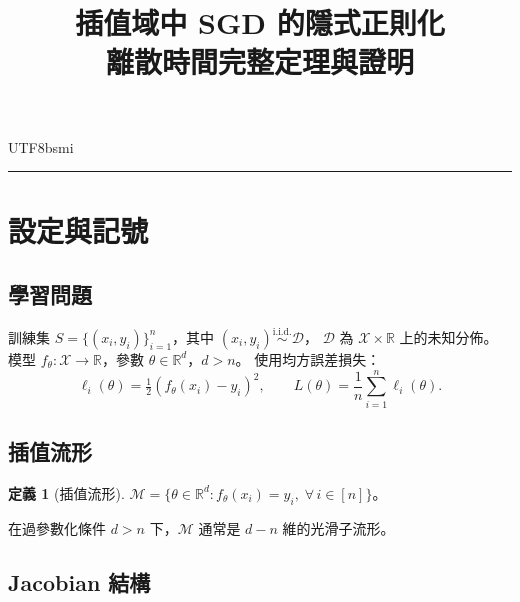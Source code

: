 \documentclass[11pt,a4paper]{article}
\theoremstyle{definition}
\newtheorem{definition}[theorem]{定義}
\newcommand{\R}{\mathbb{R}}
\newcommand{\cM}{\mathcal{M}}
\newcommand{\cX}{\mathcal{X}}
\newcommand{\cD}{\mathcal{D}}
\begin{document}
\begin{CJK}{UTF8}{bsmi}

\title{插值域中 SGD 的隱式正則化\\
  {\large 離散時間完整定理與證明}}
\author{}
\date{}
\maketitle

\tableofcontents
\bigskip\hrule\bigskip

\section{設定與記號}

\subsection{學習問題}

訓練集 $S = \{(x_i, y_i)\}_{i=1}^n$，其中 $(x_i, y_i) \stackrel{\text{i.i.d.}}{\sim} \cD$，
$\cD$ 為 $\cX \times \R$ 上的未知分佈。
模型 $f_\theta : \cX \to \R$，參數 $\theta \in \R^d$，$d > n$。
使用均方誤差損失：
\[
  \ell_i(\theta) = \tfrac{1}{2}(f_\theta(x_i) - y_i)^2, \qquad
  L(\theta) = \frac{1}{n}\sum_{i=1}^n \ell_i(\theta).
\]

\subsection{插值流形}

\begin{definition}[插值流形]
  $\cM = \{\theta \in \R^d : f_\theta(x_i) = y_i,\; \forall\, i \in [n]\}$。
\end{definition}

在過參數化條件 $d > n$ 下，$\cM$ 通常是 $d - n$ 維的光滑子流形。

\subsection{Jacobian 結構}


\end{CJK}
\end{document}
